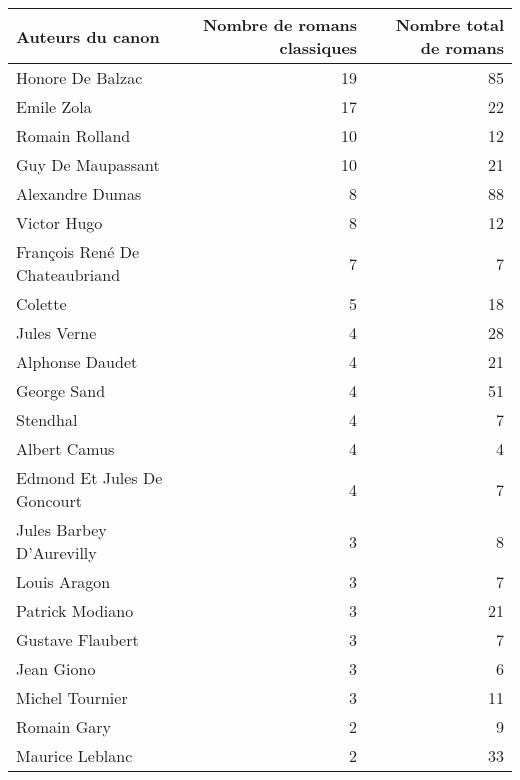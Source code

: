 \begin{xltabular}{\textwidth}{lrr}
\toprule
                    Auteurs du canon &  Nombre de romans classiques &  Nombre total de romans \\
\midrule
                    Honore De Balzac &         19 &               85 \\
                          Emile Zola &         17 &               22 \\
                      Romain Rolland &         10 &               12 \\
                   Guy De Maupassant &         10 &               21 \\
                     Alexandre Dumas &          8 &               88 \\
                         Victor Hugo &          8 &               12 \\
      François René De Chateaubriand &          7 &                7 \\
                             Colette &          5 &               18 \\
                         Jules Verne &          4 &               28 \\
                     Alphonse Daudet &          4 &               21 \\
                         George Sand &          4 &               51 \\
                            Stendhal &          4 &                7 \\
                        Albert Camus &          4 &                4 \\
         Edmond Et Jules De Goncourt &          4 &                7 \\
            Jules Barbey D'Aurevilly &          3 &                8 \\
                        Louis Aragon &          3 &                7 \\
                     Patrick Modiano &          3 &               21 \\
                    Gustave Flaubert &          3 &                7 \\
                          Jean Giono &          3 &                6 \\
                     Michel Tournier &          3 &               11 \\
                         Romain Gary &          2 &                9 \\
                     Maurice Leblanc &          2 &               33 \\

\end{xltabular}
